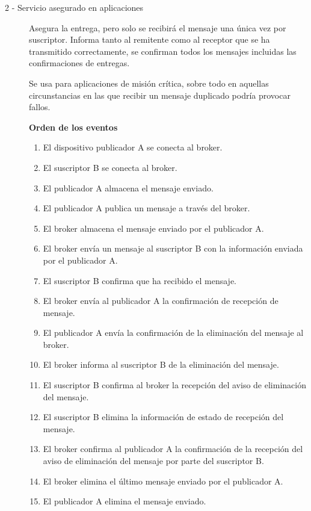 \documentclass[12pt]{report} %
\begin{document}
\begin{description}
\item[2 - Servicio asegurado en aplicaciones] Asegura la entrega, pero solo se recibirá el mensaje una única vez por suscriptor. Informa tanto al remitente como al receptor que se ha transmitido correctamente, se confirman todos los mensajes incluidas las confirmaciones de entregas.

Se usa para aplicaciones de misión crítica, sobre todo en aquellas circunstancias en las que recibir un mensaje duplicado podría provocar fallos.

	\textbf{Orden de los eventos}
	\begin{enumerate}
	\item El dispositivo publicador A se conecta al broker.
	\item El suscriptor B se conecta al broker.
	\item El publicador A almacena el mensaje enviado.
	\item El publicador A publica un mensaje a través del broker.
	\item El broker almacena el mensaje enviado por el publicador A.
	\item El broker envía un mensaje al suscriptor B con la información enviada por el publicador A.
	\item El suscriptor B confirma que ha recibido el mensaje.
	\item El broker envía al publicador A la confirmación de recepción de mensaje.
	\item El publicador A envía la confirmación de la eliminación del mensaje al broker.
	\item El broker informa al suscriptor B de la eliminación del mensaje.
	\item El suscriptor B confirma al broker la recepción del aviso de eliminación del mensaje.
	\item El suscriptor B elimina la información de estado de recepción del mensaje.
	\item El broker confirma al publicador A la confirmación de la recepción del aviso de eliminación del mensaje por parte del suscriptor B.
	\item El broker elimina el último mensaje enviado por el publicador A.
	\item El publicador A elimina el mensaje enviado.
	\end{enumerate}
	

\end{description}
\end{document}
